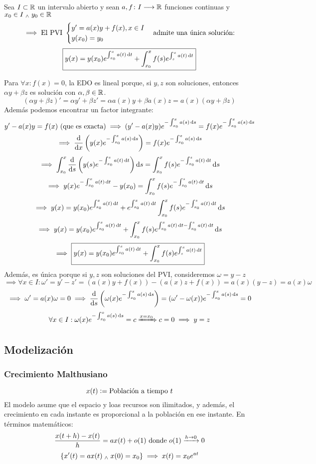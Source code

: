 \documentclass[12pt]{article}
\begin{document}
\begin{teo}[Ejercicio 2.3]
    Sea $I\subset \mathbb{R}$ un intervalo abierto y sean $a, f \colon I \longrightarrow \mathbb{R}$ funciones continuas y $x_0 \in I \; _{\wedge} \; y_0 \in \mathbb{R}$
    \[\implies \text{El PVI } \begin{cases}
        y'=a(x)y + f(x), x\in I\\
        y(x_0) = y_0
    \end{cases} \text{admite una única solución:}\]
    \[\boxed{y(x)=y(x_0)e^{\int_{x_0}^xa(t)\odif{t}}+\int_{x_0}^xf(s)e^{\int_s^xa(t)\odif{t}}}\]
    \begin{dem}
        Para $\forall x : f(x)=0$, la EDO es lineal porque, si $y, z$ son soluciones, entonces $\alpha y +\beta z$ es solución con $\alpha, \beta \in \mathbb{R}$.
    \[(\alpha y +\beta z)'=\alpha y' + \beta z'= \alpha a(x)y+ \beta a(x)z=a(x)\left(\alpha y + \beta z\right)\]
    Además podemos encontrar un factor integrante:
    \[y'-a(x)y=f(x) \tex{ (que es exacta)} \implies (y'-a(x)y)e^{-\int_{x_0}^xa(s)\odif{s}}=f(x)e^{-\int_{x_0}^xa(s)\odif{s}}\]
    \[\implies \odv{}{x}\left(y(x)e^{-\int_{x_0}^xa(s)\odif{s}}\right)=f(x)e^{-\int_{x_0}^xa(s)\odif{s}}\]
    \[\implies \int_{x_0}^x\odv{}{s}\left(y(s)e^{-\int_{x_0}^sa(t)\odif{t}}\right)\odif{s}=\int_{x_0}^xf(s)e^{-\int_{x_0}^sa(t)\odif{t}}\odif{s}\]
    \[\implies y(x)e^{-\int_{x_0}^xa(t)\odif{t}}-y(x_0)=\int_{x_0}^xf(s)e^{-\int_{x_0}^sa(t)\odif{t}}\odif{s}\]
    \[\implies y(x)=y(x_0)e^{\int_{x_0}^xa(t)\odif{t}}+e^{\int_{x_0}^xa(t)\odif{t}}\int_{x_0}^xf(s)e^{-\int_{x_0}^sa(t)\odif{t}}\odif{s}\]
    \[\implies y(x)=y(x_0)e^{\int_{x_0}^xa(t)\odif{t}}+\int_{x_0}^xf(s)e^{\int_{x_0}^xa(t)\odif{t}-\int_{x_0}^sa(t)\odif{t}}\odif{s}\]
    \[\implies \boxed{y(x)=y(x_0)e^{\int_{x_0}^xa(t)\odif{t}}+\int_{x_0}^xf(s)e^{\int_s^xa(t)\odif{t}}}\]
    Además, es única porque si $y, z$ son soluciones del PVI, consideremos $\omega = y-z$
    \[\implies \forall x \in I :\omega'=y'-z'=(a(x)y+f(x)) - (a(x)z+f(x))=a(x)(y-z)=a(x)\omega\]
    \[\implies \omega'=a(x)\omega=0 \implies \odv{}{s}\left(\omega(x)e^{-\int_{x_0}^xa(s)\odif{s}}\right)=(\omega' - \omega(x))e^{-\int_{x_0}^xa(s)\odif{s} } = 0\]
    \[\forall x\in I : \omega(x)e^{-\int_{x_0}^xa(s)\odif{s} }=c \xRightarrow{x=x_0} c=0 \implies y=z\]
    \end{dem}
\end{teo}

\subsection{Modelización}
\subsubsection{Crecimiento Malthusiano}
\label{sec:malthusiano}
\[x(t)\vcentcolon= \text{Población a tiempo $t$}\]
El modelo asume que el espacio y loas recursos son ilimitados, y además, el crecimiento en cada instante es proporcional a la población en ese instante. En términos matemáticos:
\[\frac{x(t+h)-x(t)}{h}=ax(t)+o(1) \text{ donde } o(1)\xrightarrow{h\rightarrow 0}0\]
\[\{x'(t) = ax(t) \; _{\wedge} \; x(0) = x_0\} \implies x(t)=x_0e^{at}\]
\end{document}
